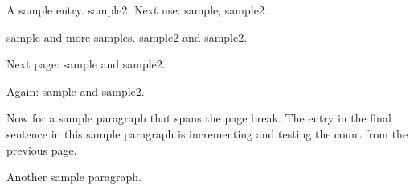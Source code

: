\documentclass{article}
\begin{document}
A \gls{sample} entry. \Gls{sample2}.
Next use: \gls{sample}, \gls{sample2}.

\lipsum[1]

\Gls{sample} and more \glspl{sample}.
\Gls{sample2} and \gls{sample2}.

\newpage

Next page: \gls{sample} and \gls{sample2}.

Again: \gls{sample} and \gls{sample2}.

\lipsum[2-5]

Now for a \gls{sample} paragraph that spans the page break.
\lipsum*[6-7] The entry in the final sentence in this \gls{sample} paragraph
is incrementing and testing the count from the previous page.

Another \gls{sample} paragraph.

\printglossaries
\end{document}
